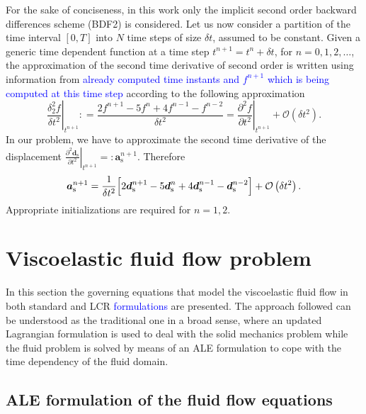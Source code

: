 \documentclass[11pt,english]{article}
\begin{document}
For the sake of conciseness, in this work only the implicit second order backward differences scheme (BDF2) is considered. Let us now consider a partition of the time interval $[0,T]$ into $N$ time steps of size $\delta t$, assumed to be constant. Given a generic time dependent function at a time step $t^{n+1} = t^n + \delta t$, for $n=0,1,2,\dots$, the approximation of the second time derivative of second order is written using information from \textcolor{blue}{already computed time instants and $f^{n+1}$ which is being computed at this time step} according to the following approximation
\[
\left.\frac{\delta_2^2 f}{\delta t^2}\right\vert _{t^{n+1}} : =\frac{2f^{n+1}-5f^{n}+4f^{n-1}-f^{n-2}}{\delta t^2} = 
    \left.\frac{\partial^2 f}{\partial t^2}\right\vert _{t^{n+1}} +\mathcal{O}(\delta t^{2}).
\]
In our problem, we have to approximate the second time derivative of the displacement $ \left.\frac{\partial^{2}\boldsymbol{d}_{\mathrm{s}}}{\partial t^2} \right\vert _{t^{n+1}} =: \boldsymbol{a}_{\mathrm{s}}^{n+1} $. Therefore
\begin{equation*}
    \boldsymbol{a}_{\mathrm{s}}^{n+1} = \frac{1}{\delta t^2} \Bigl[ 2\boldsymbol{d}_{\mathrm{s}}^{n+1} - 5\boldsymbol{d}_{\mathrm{s}}^n + 4\boldsymbol{d}_{\mathrm{s}}^{n-1} - \boldsymbol{d}_{\mathrm{s}}^{n-2} \Bigr] + \mathcal{O}\left( \delta t^2 \right).
\end{equation*}
Appropriate initializations are required for $n=1,2$.


%
%
\section{Viscoelastic fluid flow problem} \label{sec:Viscoelastic-fluid-flow-prob}

In this section the governing equations that model the viscoelastic fluid flow in both standard and LCR \textcolor{blue}{formulations} are presented. The approach followed can be understood as the traditional one in a broad sense, where an updated Lagrangian formulation is used to deal with the solid mechanics problem while the fluid problem is solved by means of an ALE formulation to cope with the time dependency of the fluid domain. 

\subsection{ALE formulation of the fluid flow equations}
\end{document}
